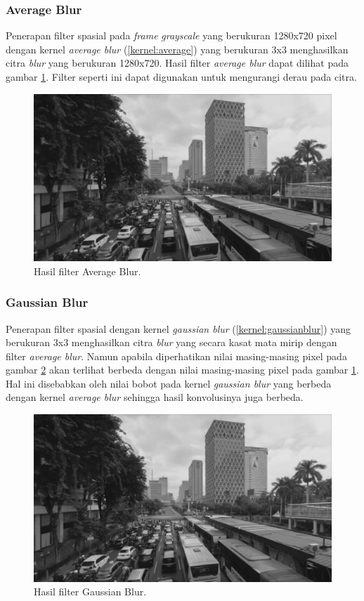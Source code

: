 
\subsubsection{Average Blur}
Penerapan filter spasial pada \textit{frame} \textit{grayscale} yang berukuran 1280x720 pixel dengan kernel \textit{average blur} (\ref{kernel:average}) yang berukuran 3x3 menghasilkan citra 
\textit{blur} yang berukuran 1280x720. Hasil filter \textit{average blur} dapat dilihat pada gambar \ref{fig:output-averageblur}. Filter seperti ini dapat digunakan untuk mengurangi derau pada citra.
\begin{figure}
    \includegraphics[width=0.8\linewidth, center]{images/output-image/input1-averageblur.png}
    \caption{Hasil filter Average Blur.}
    \label{fig:output-averageblur}
\end{figure}

\subsubsection{Gaussian Blur}
Penerapan filter spasial dengan kernel \textit{gaussian blur} (\ref{kernel:gaussianblur}) yang berukuran 3x3 menghasilkan citra \textit{blur} yang secara kasat mata mirip dengan filter \textit{average blur}. Namun apabila diperhatikan nilai masing-masing pixel pada gambar \ref{fig:output-gaussianblur} akan terlihat berbeda dengan nilai masing-masing pixel pada gambar \ref{fig:output-averageblur}. Hal ini disebabkan oleh nilai bobot pada kernel \textit{gaussian blur} yang berbeda dengan kernel \textit{average blur} sehingga hasil konvolusinya juga berbeda. 
\begin{figure}
    \includegraphics[width=0.8\linewidth, center]{images/output-image/input1-gaussianblur.png}
    \caption{Hasil filter Gaussian Blur.}
    \label{fig:output-gaussianblur}
\end{figure}

